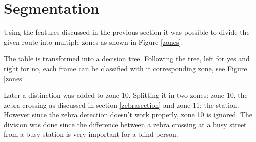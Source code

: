 \clearpage
\section{Segmentation}

Using the features discussed in the previous section it was possible to divide the given route into multiple zones as shown in Figure \ref{zones}.

The table is transformed into a decision tree. Following the tree, left for yes and right for no, each frame can be classified with it corresponding zone, see Figure \ref{zones}.

\clearpage
Later a distinction was added to zone 10. Splitting it in two zones: zone 10, the zebra crossing as discussed in section \ref{zebrasection} and zone 11: the station. However since the zebra detection doesn't work properly, zone 10 is ignored. The division was done since the difference between a zebra crossing at a busy street from a busy station is very important for a blind person.